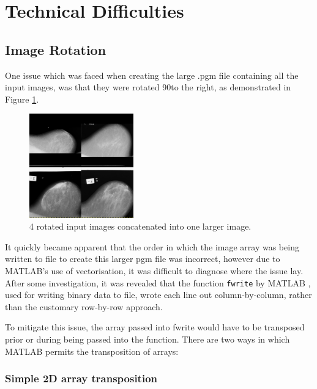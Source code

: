 \section{Technical Difficulties}
\label{sec:tech-diff}

\subsection{Image Rotation}
\label{ssec:trans}

One issue which was faced when creating the large .pgm file containing all the input images, was that they were rotated 90\degree to the right, as demonstrated in Figure \ref{fig:rotated-input}.

\begin{figure}[H]
  \centering
  \includegraphics[width=0.4\textwidth]{Chapter2/technical-img/rotation.png}
  \caption{4 rotated input images concatenated into one larger image.}
  \label{fig:rotated-input}
\end{figure}

It quickly became apparent that the order in which the image array was being written to file to create this larger pgm file was incorrect, however due to MATLAB's use of vectorisation, it was difficult to diagnose where the issue lay. After some investigation, it was revealed that the function \texttt{fwrite} by MATLAB \cite{fwrite}, used for writing binary data to file, wrote each line out column-by-column, rather than the customary row-by-row approach.

To mitigate this issue, the array passed into fwrite would have to be transposed prior or during being passed into the function. There are two ways in which MATLAB permits the \gls{transposition} of arrays:

\subsubsection{Simple 2D array transposition}

